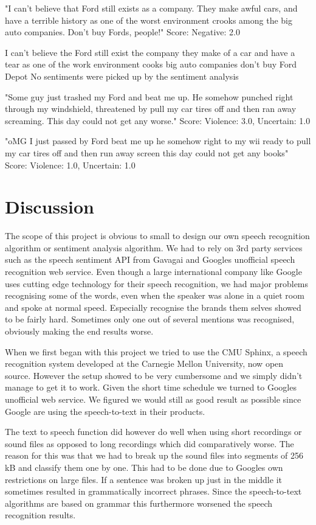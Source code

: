 \documentclass[a4paper,12pt,twoside]{ltxdoc}
\begin{document}
"I can't believe that Ford still exists as a company. They make awful cars, and have a terrible history as one of the worst environment crooks among the big auto companies. Don't buy Fords, people!"
Score: Negative: 2.0

I can't believe the Ford still exist the company they make of a car and have a tear as one of the work environment cooks big auto companies don't buy Ford Depot
No sentiments were picked up by the sentiment analysis

"Some guy just trashed my Ford and beat me up. He somehow punched right through my windshield, threatened by pull my car tires off and then ran away screaming. This day could not get any worse."
Score: Violence: 3.0, Uncertain: 1.0

"oMG I just passed by Ford beat me up he somehow right to my wii ready to pull my car tires off and then run away screen this day could not get any books"
Score: Violence: 1.0, Uncertain: 1.0

\section{Discussion}
The scope of this project is obvious to small to design our own speech recognition algorithm or sentiment analysis algorithm. We had to rely on 3rd party services such as the speech sentiment API from Gavagai and Googles unofficial speech recognition web service. Even though a large international company like Google uses cutting edge technology for their speech recognition, we had major problems recognising some of the words, even when the speaker was alone in a quiet room and spoke at normal speed. Especially recognise the brands them selves showed to be fairly hard. Sometimes only one out of several mentions was recognised, obviously making the end results worse. 

When we first began with this project we tried to use the CMU Sphinx, a speech recognition system developed at the Carnegie Mellon University, now open source. However the setup showed to be very cumbersome and we simply didn't manage to get it to work. Given the short time schedule we turned to Googles unofficial web service. We figured we would still as good result as possible since Google are using the speech-to-text in their products. 

The text to speech function did however do well when using short recordings or sound files as opposed to long recordings which did comparatively worse. The reason for this was that we had to break up the sound files into segments of 256 kB and classify them one by one. This had to be done due to Googles own restrictions on large files. If a sentence was broken up just in the middle it sometimes resulted in grammatically incorrect phrases. Since the speech-to-text algorithms are based on grammar this furthermore worsened the speech recognition results.
\end{document}
